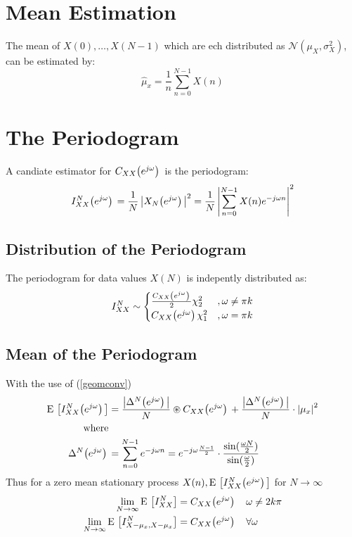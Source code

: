 \documentclass[accentcolor=tud4c,9.5pt,nochapname,bigchapter,paper=a5report]{tudreport}
\begin{document}
\section{Mean Estimation}
The mean of $X(0),\ldots ,X(N-1)$ which are ech distributed as $\mathcal{N}(\mu_X,\sigma_X^2)$, can be estimated by:
\begin{equation}
\hat{{\mu}}_x=\frac{1}{n}\sum\limits_{n=0}^{N-1}X(n)
\end{equation}

\section{The Periodogram}
A candiate estimator for $C_{XX}{\left(e^{j\omega}\right)}\,$ is the periodogram:
\begin{equation}
I_{XX}^{N}{\left(e^{j\omega}\right)}\, = \frac{1}{N}\left|X_N{\left(e^{j\omega}\right)}\,\right|^2 = \frac{1}{N}\left|\sum\limits_{n=0}^{N-1} X(n) e^{-j\omega n}\right|^2
\end{equation}
\subsection{Distribution of the Periodogram}
The periodogram for data values $X(N)$ is indepently distributed as:
\begin{equation}
I_{XX}^{N} \sim \begin{cases}
\frac{C_{XX}{\left(e^{j\omega}\right)}\,}{2}\chi_2^2 &,\omega \neq \pi k \\
C_{XX}{\left(e^{j\omega}\right)}\,\chi_1^2 &,\omega = \pi k \\
\end{cases}
\end{equation}

\subsection{Mean of the Periodogram}
With the use of (\ref{geomconv})
\begin{subequations}
\begin{align}
{\rm E}\,\left[I_{XX}^{N}{\left(e^{j\omega}\right)}\,\right] &= \frac{\left|\Delta^N{\left(e^{j\omega}\right)}\,\right|}{N} \circledast C_{XX}{\left(e^{j\omega}\right)}\, 
+\frac{\left|\Delta^N{\left(e^{j\omega}\right)}\,\right|}{N} \cdot \left|\mu_x\right|^2 \\
\text{where} \notag \\
\Delta^N{\left(e^{j\omega}\right)}\, &= \sum\limits_{n=0}^{N-1}e^{-j\omega n} = e ^{-j \omega \frac{N-1}{2}} \cdot \frac{\sin(\frac{\omega N}{2})}{\sin(\frac{\omega}{2})}
\end{align}

\end{subequations}
Thus for a zero mean stationary process $X(n),{\rm E}\,\left[I_{XX}^{N}{\left(e^{j\omega}\right)}\,\right]$ for $N\rightarrow\infty$
\begin{subequations}
\begin{align}
\lim\limits_{N\rightarrow\infty} {\rm E}\,\left[I_{XX}^{N}\right] &= C_{XX}{\left(e^{j\omega}\right)}\, \quad \omega \neq 2k\pi \\
\lim\limits_{N\rightarrow\infty} {\rm E}\,\left[I_{X-\mu_x,X-\mu_x}^{N}\right] &= C_{XX}{\left(e^{j\omega}\right)}\, \quad \forall\omega
\end{align}
\end{subequations}
\end{document}
